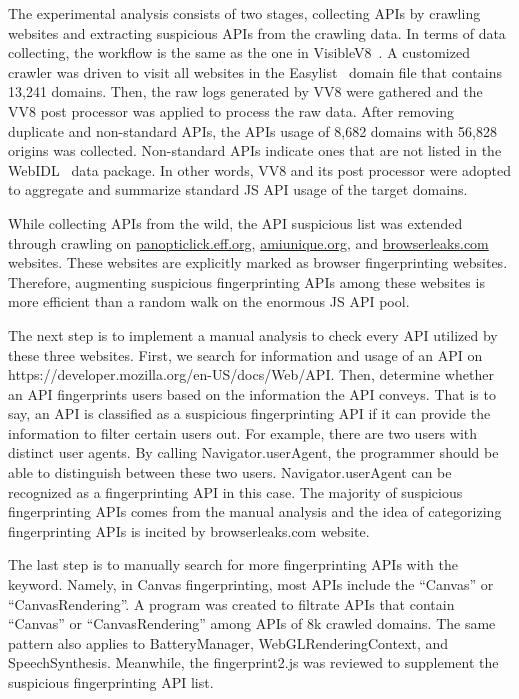 The experimental analysis consists of two stages, collecting APIs by crawling websites and extracting suspicious APIs from the crawling data. In terms of data collecting, the workflow is the same as the one in VisibleV8~\cite{vv8-imc19}. A customized crawler was driven to visit all websites in the Easylist~\cite{Easylist} domain file that contains 13,241 domains. Then, the raw logs generated by VV8 were gathered and the VV8 post processor was applied to process the raw data. After removing duplicate and non-standard APIs, the APIs usage of 8,682 domains with 56,828 origins was collected. Non-standard APIs indicate ones that are not listed in the WebIDL~\cite{webidl} data package. In other words, VV8 and its post processor were adopted to aggregate and summarize standard JS API usage of the target domains.

While collecting APIs from the wild, the API suspicious list was extended through crawling on \url{panopticlick.eff.org}, \url{amiunique.org}, and \url{browserleaks.com} websites. These websites are explicitly marked as browser fingerprinting websites. Therefore, augmenting suspicious fingerprinting APIs among these websites is more efficient than a random walk on the enormous JS API pool.

The next step is to implement a manual analysis to check every API utilized by these three websites. First, we search for information and usage of an API on https://developer.mozilla.org/en-US/docs/Web/API. Then, determine whether an API fingerprints users based on the information the API conveys. That is to say, an API is classified as a suspicious fingerprinting API if it can provide the information to filter certain users out. For example, there are two users with distinct user agents. By calling Navigator.userAgent, the programmer should be able to distinguish between these two users. Navigator.userAgent can be recognized as a fingerprinting API in this case. The majority of suspicious fingerprinting APIs comes from the manual analysis and the idea of categorizing fingerprinting APIs is incited by browserleaks.com website. 

The last step is to manually search for more fingerprinting APIs with the keyword. Namely, in Canvas fingerprinting, most APIs include the ``Canvas'' or ``CanvasRendering''. A program was created to filtrate APIs that contain ``Canvas'' or ``CanvasRendering'' among APIs of 8k crawled domains. The same pattern also applies to BatteryManager, WebGLRenderingContext, and SpeechSynthesis. Meanwhile, the fingerprint2.js was reviewed to supplement the suspicious fingerprinting API list.  

